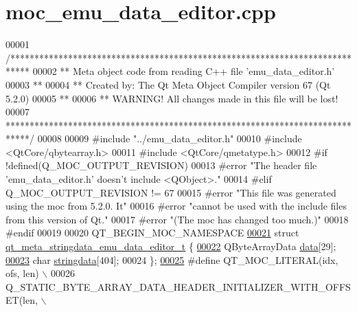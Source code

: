 \hypertarget{a00014_source}{\section{moc\+\_\+emu\+\_\+data\+\_\+editor.\+cpp}
\label{a00014_source}
}

\begin{DoxyCode}
00001 \textcolor{comment}{/****************************************************************************}
00002 \textcolor{comment}{** Meta object code from reading C++ file 'emu\_data\_editor.h'}
00003 \textcolor{comment}{**}
00004 \textcolor{comment}{** Created by: The Qt Meta Object Compiler version 67 (Qt 5.2.0)}
00005 \textcolor{comment}{**}
00006 \textcolor{comment}{** WARNING! All changes made in this file will be lost!}
00007 \textcolor{comment}{*****************************************************************************/}
00008 
00009 \textcolor{preprocessor}{#include "../emu\_data\_editor.h"}
00010 \textcolor{preprocessor}{#include <QtCore/qbytearray.h>}
00011 \textcolor{preprocessor}{#include <QtCore/qmetatype.h>}
00012 \textcolor{preprocessor}{#if !defined(Q\_MOC\_OUTPUT\_REVISION)}
00013 \textcolor{preprocessor}{#error "The header file 'emu\_data\_editor.h' doesn't include <QObject>."}
00014 \textcolor{preprocessor}{#elif Q\_MOC\_OUTPUT\_REVISION != 67}
00015 \textcolor{preprocessor}{#error "This file was generated using the moc from 5.2.0. It"}
00016 \textcolor{preprocessor}{#error "cannot be used with the include files from this version of Qt."}
00017 \textcolor{preprocessor}{#error "(The moc has changed too much.)"}
00018 \textcolor{preprocessor}{#endif}
00019 
00020 QT\_BEGIN\_MOC\_NAMESPACE
\hypertarget{a00014_source_l00021}{}\hyperlink{a00014}{00021} \textcolor{keyword}{struct }\hyperlink{a00014_d9/d77/a00095}{qt\_meta\_stringdata\_emu\_data\_editor\_t} \{
\hypertarget{a00014_source_l00022}{}\hyperlink{a00014_a91db052cb5a1fcce8e53e81902e8e90b}{00022}     QByteArrayData \hyperlink{a00014_a91db052cb5a1fcce8e53e81902e8e90b}{data}[29];
\hypertarget{a00014_source_l00023}{}\hyperlink{a00014_ae988ab8add535bff49a0c5d5ec714851}{00023}     \textcolor{keywordtype}{char} \hyperlink{a00014_ae988ab8add535bff49a0c5d5ec714851}{stringdata}[404];
00024 \};
\hypertarget{a00014_source_l00025}{}\hyperlink{a00014_a75bb9482d242cde0a06c9dbdc6b83abe}{00025} \textcolor{preprocessor}{#define QT\_MOC\_LITERAL(idx, ofs, len) \(\backslash\)}
00026 \textcolor{preprocessor}{    Q\_STATIC\_BYTE\_ARRAY\_DATA\_HEADER\_INITIALIZER\_WITH\_OFFSET(len, \(\backslash\)}

\end{DoxyCode}
